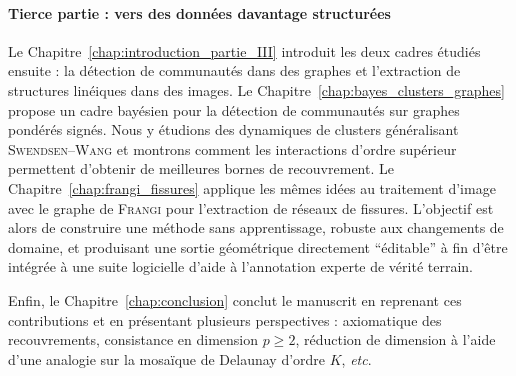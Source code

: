\paragraph{Tierce partie : vers des données davantage structurées}
Le Chapitre~\ref{chap:introduction_partie_III} introduit les deux cadres étudiés ensuite : la détection de communautés dans des graphes et l'extraction de structures linéiques dans des
images. 
Le Chapitre~\ref{chap:bayes_clusters_graphes} propose un cadre bayésien pour la détection de communautés sur graphes pondérés signés. 
Nous y étudions des dynamiques de clusters généralisant \textsc{Swendsen--Wang} et montrons comment les interactions d'ordre supérieur permettent d'obtenir de meilleures bornes de recouvrement. 
Le Chapitre~\ref{chap:frangi_fissures} applique les mêmes idées au traitement d'image avec le graphe de \textsc{Frangi} pour l'extraction de réseaux de fissures.
L'objectif est alors de construire une méthode sans apprentissage, robuste aux changements de domaine, et produisant une sortie géométrique directement ``éditable'' à fin d'être intégrée à une suite logicielle d'aide à l'annotation experte de vérité terrain.

Enfin, le Chapitre~\ref{chap:conclusion} conclut le manuscrit en reprenant ces contributions et en présentant plusieurs perspectives : axiomatique des recouvrements, consistance en dimension $p\geq2$, réduction de dimension à l'aide d'une analogie sur la mosaïque de Delaunay d'ordre $K$, \emph{etc}.

